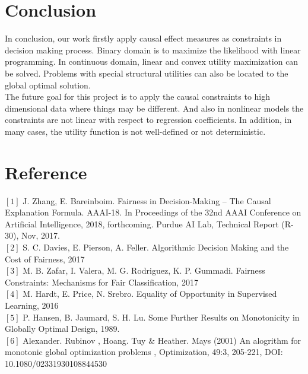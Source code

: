 \documentclass{article} %
\begin{document}
\section{Conclusion}
\hspace*{2em}In conclusion,  our work firstly apply causal effect measures as constraints in decision making process. Binary domain is to maximize the likelihood with linear programming. In continuous domain, linear and convex utility maximization can be solved. Problems with special structural utilities can also be located to the global optimal solution. 
\\
\hspace*{1em}The future goal for this project is to apply the causal constraints to high dimensional data where things may be different. And also in nonlinear models the constraints are not linear with respect to regression coefficients. In addition, in many cases, the utility function is not well-defined or not deterministic. 


\section{Reference}
$[1]$ J. Zhang, E. Bareinboim. Fairness in Decision-Making -- The Causal Explanation Formula. AAAI-18. In Proceedings of the 32nd AAAI Conference on Artificial Intelligence, 2018, forthcoming. Purdue AI Lab, Technical Report (R-30), Nov, 2017.\\
$[2]$ S. C. Davies, E. Pierson, A. Feller. Algorithmic Decision Making and the Cost of Fairness, 2017\\
$[3]$ M. B. Zafar, I. Valera, M. G. Rodriguez, K. P. Gummadi. Fairness Constraints: Mechanisms for Fair Classification, 2017\\
$[4]$ M. Hardt, E. Price, N. Srebro. Equality of Opportunity in Supervised Learning, 2016\\
$[5]$ P. Hansen, B. Jaumard, S. H. Lu. Some Further Results on Monotonicity in Globally Optimal Design, 1989.\\
$[6]$ Alexander. Rubinov , Hoang. Tuy $\&$ Heather. Mays (2001) An alogrithm for monotonic global optimization problems , Optimization, 49:3, 205-221, DOI: 10.1080/02331930108844530\\
\end{document}
